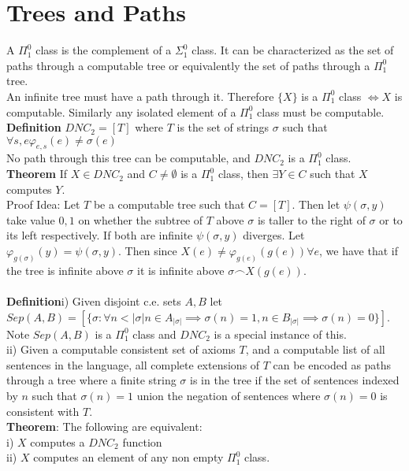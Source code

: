 \documentclass{article}
\begin{document}
   \section{Trees and Paths} 
	A $\Pi^0_1$ class is the complement of a $\Sigma^0_1$ class. It can be characterized as the set of paths through a computable tree or equivalently the set of paths through a $\Pi^0_1$ tree.\\
	An infinite tree must have a path through it. Therefore $\{X\}$ is a $\Pi^0_1$ class $\iff X$ is computable. Similarly any isolated element of a $\Pi^0_1$ class must be computable.\\
	\textbf{Definition} $DNC_2 = [T]$ where $T$ is the set of strings $\sigma$ such that $\forall s,e  \varphi_{e,s}(e) \neq \sigma(e)$ \\
	No path through this tree can be computable, and $DNC_2$ is a $\Pi^0_1$ class.\\
	\textbf{Theorem} If $X \in DNC_2$ and $C\neq  \emptyset$ is a $\Pi_1^0$ class, then $\exists Y \in C$ such that $X$ computes $Y$.\\
	Proof Idea: Let $T$ be a computable tree such that $C = [T]$. Then let $\psi(\sigma,y)$ take value $0,1 $ on whether the subtree of $T$ above $\sigma$ is taller to the right of $\sigma$ or to its left respectively. If both are infinite $\psi(\sigma,y)$ diverges.  Let $\varphi_{g(\sigma)}(y) = \psi(\sigma,y)$. Then since $X(e)\neq \varphi_{g(e)}(g(e)) \forall e$, we have that if the tree is infinite above $\sigma$ it is infinite above $\sigma \frown X(g(e))$.
	\\
	\\
	\textbf{Definition}i) Given disjoint c.e. sets $A,B$ let $Sep(A,B) = [\{\sigma : \forall n<|\sigma| n \in A_{|\sigma|} \implies \sigma(n)=1, n \in B_{|\sigma|} \implies \sigma(n)=0\}]$. Note $Sep(A,B)$ is a $\Pi^0_1$ class and $DNC_2$ is a special instance of this.\\
	ii) Given a computable consistent set of axioms $T$, and a computable list of all sentences in the language, all complete extensions of $T$ can be encoded as paths through a tree where a finite string $\sigma$ is in the tree if the set of sentences indexed by $n$ such that $\sigma(n)=1$ union the negation of sentences where $\sigma(n)=0$ is consistent with $T$.
	\\
	\textbf{Theorem}: The following are equivalent:\\
	i) $X$ computes a $DNC_2$ function\\
	ii) $X$ computes an element of any non empty $\Pi^0_1$ class.\\
\end{document}

